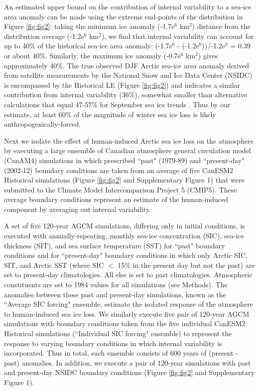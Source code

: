 \documentclass{nature}
\begin{document}
An estimated upper bound on the contribution of internal variability to a sea-ice area anomaly can be made using the extreme end-points of the distribution in Figure \ref{fig:fig2}: taking the minimum ice anomaly (-1.7e$^6$ km$^2$) distance from the distribution average (-1.2e$^6$ km$^2$), we find that internal variability can account for up to 40\% of the historical sea-ice area anomaly: (-1.7e$^6$ - (-1.2e$^6$))/-1.2e$^6$ = 0.39 or about 40\%. Similarly, the maximum ice anomaly (-0.7e$^6$ km$^2$) gives approximately 40\%. The true observed DJF Arctic sea-ice area anomaly derived from satellite measurements by the National Snow and Ice Data Center (NSIDC) is encompassed by the Historical LE (Figure \ref{fig:fig2}) and indicates a similar contribution from internal variability (36\%), somewhat smaller than alternative calculations that equal 47-57\% for September sea ice trends \cite{kay11,stroeve07}. Thus by our estimate, at least 60\% of the magnitude of winter sea ice loss is likely anthropogenically-forced. 

Next we isolate the effect of human-induced Arctic sea ice loss on the atmosphere by executing a large ensemble of Canadian atmosphere general circulation model (CanAM4) simulations in which prescribed ``past" (1979-89) and ``present-day" (2002-12) boundary conditions are taken from an average of five CanESM2 Historical simulations (Figure \ref{fig:fig2} and Supplementary Figure 1) that were submitted to the Climate Model Intercomparison Project 5 (CMIP5). These average boundary conditions represent an estimate of the human-induced component by averaging out internal variability. 

A set of five 120-year AGCM simulations, differing only in initial conditions, is executed with annually-repeating, monthly sea-ice concentration (SIC), sea-ice thickness (SIT), and sea surface temperature (SST) for ``past" boundary conditions and for ``present-day" boundary conditions in which only Arctic SIC, SIT, and Arctic SST (where SIC $<$ 15\% in the present day but not the past) are set to present-day climatologies. All else is set to past climatologies. Atmospheric constituents are set to 1984 values for all simulations (see Methods). The anomalies between these past and present-day simulations, known as the ``Average SIC forcing" ensemble, estimate the isolated response of the atmosphere to human-induced sea ice loss. We similarly execute five pair of 120-year AGCM simulations with boundary conditions taken from the five individual CanESM2 Historical simulations (``Individual SIC forcing" ensemble) to represent the response to varying boundary conditions in which internal variability is incorporated. Thus in total, each ensemble consists of 600 years of (present - past) anomalies. In addition, we execute a pair of 120-year simulations with past and present-day NSIDC boundary conditions (Figure \ref{fig:fig2} and Supplementary Figure 1).
\end{document}
